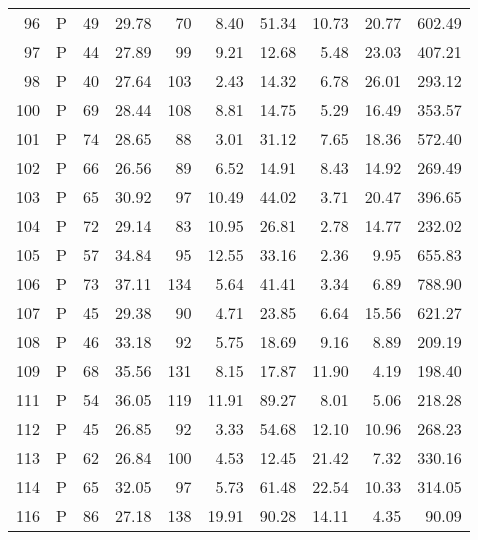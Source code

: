 \begin{table}[ht]
\begin{tabular}{rlrrrrrrrr}
  96 & P &  49 & 29.78 &  70 & 8.40 & 51.34 & 10.73 & 20.77 & 602.49 \\ 
  97 & P &  44 & 27.89 &  99 & 9.21 & 12.68 & 5.48 & 23.03 & 407.21 \\ 
  98 & P &  40 & 27.64 & 103 & 2.43 & 14.32 & 6.78 & 26.01 & 293.12 \\ 
  100 & P &  69 & 28.44 & 108 & 8.81 & 14.75 & 5.29 & 16.49 & 353.57 \\ 
  101 & P &  74 & 28.65 &  88 & 3.01 & 31.12 & 7.65 & 18.36 & 572.40 \\ 
  102 & P &  66 & 26.56 &  89 & 6.52 & 14.91 & 8.43 & 14.92 & 269.49 \\ 
  103 & P &  65 & 30.92 &  97 & 10.49 & 44.02 & 3.71 & 20.47 & 396.65 \\ 
  104 & P &  72 & 29.14 &  83 & 10.95 & 26.81 & 2.78 & 14.77 & 232.02 \\ 
  105 & P &  57 & 34.84 &  95 & 12.55 & 33.16 & 2.36 & 9.95 & 655.83 \\ 
  106 & P &  73 & 37.11 & 134 & 5.64 & 41.41 & 3.34 & 6.89 & 788.90 \\ 
  107 & P &  45 & 29.38 &  90 & 4.71 & 23.85 & 6.64 & 15.56 & 621.27 \\ 
  108 & P &  46 & 33.18 &  92 & 5.75 & 18.69 & 9.16 & 8.89 & 209.19 \\ 
  109 & P &  68 & 35.56 & 131 & 8.15 & 17.87 & 11.90 & 4.19 & 198.40 \\ 
  111 & P &  54 & 36.05 & 119 & 11.91 & 89.27 & 8.01 & 5.06 & 218.28 \\ 
  112 & P &  45 & 26.85 &  92 & 3.33 & 54.68 & 12.10 & 10.96 & 268.23 \\ 
  113 & P &  62 & 26.84 & 100 & 4.53 & 12.45 & 21.42 & 7.32 & 330.16 \\ 
  114 & P &  65 & 32.05 &  97 & 5.73 & 61.48 & 22.54 & 10.33 & 314.05 \\ 
  116 & P &  86 & 27.18 & 138 & 19.91 & 90.28 & 14.11 & 4.35 & 90.09 \\ 
   \hline
\end{tabular}
\end{table}
